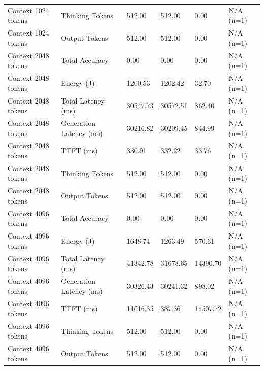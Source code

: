 \begin{table}
\begin{tabular}{llllll}
Context 1024 tokens & Thinking Tokens & 512.00 & 512.00 & 0.00 & N/A (n=1) \\
Context 1024 tokens & Output Tokens & 512.00 & 512.00 & 0.00 & N/A (n=1) \\
Context 2048 tokens & Total Accuracy & 0.00 & 0.00 & 0.00 & N/A (n=1) \\
Context 2048 tokens & Energy (J) & 1200.53 & 1202.42 & 32.70 & N/A (n=1) \\
Context 2048 tokens & Total Latency (ms) & 30547.73 & 30572.51 & 862.40 & N/A (n=1) \\
Context 2048 tokens & Generation Latency (ms) & 30216.82 & 30209.45 & 844.99 & N/A (n=1) \\
Context 2048 tokens & TTFT (ms) & 330.91 & 332.22 & 33.76 & N/A (n=1) \\
Context 2048 tokens & Thinking Tokens & 512.00 & 512.00 & 0.00 & N/A (n=1) \\
Context 2048 tokens & Output Tokens & 512.00 & 512.00 & 0.00 & N/A (n=1) \\
Context 4096 tokens & Total Accuracy & 0.00 & 0.00 & 0.00 & N/A (n=1) \\
Context 4096 tokens & Energy (J) & 1648.74 & 1263.49 & 570.61 & N/A (n=1) \\
Context 4096 tokens & Total Latency (ms) & 41342.78 & 31678.65 & 14390.70 & N/A (n=1) \\
Context 4096 tokens & Generation Latency (ms) & 30326.43 & 30241.32 & 898.02 & N/A (n=1) \\
Context 4096 tokens & TTFT (ms) & 11016.35 & 387.36 & 14507.72 & N/A (n=1) \\
Context 4096 tokens & Thinking Tokens & 512.00 & 512.00 & 0.00 & N/A (n=1) \\
Context 4096 tokens & Output Tokens & 512.00 & 512.00 & 0.00 & N/A (n=1) \\
\bottomrule
\end{tabular}
\end{table}
